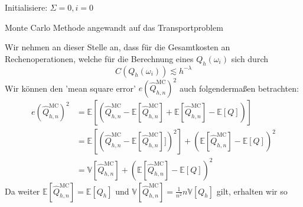 \begin{algorithm}[H]
	\DontPrintSemicolon
	\SetAlgoLined
	\BlankLine
	Initialisiere: $ \Sigma =0, i=0 $\;
	\BlankLine
	\caption{Monte Carlo Methode angewandt auf das Transportproblem}
\end{algorithm}
\bigskip %
 Wir nehmen an dieser Stelle an, dass für die Gesamtkosten an Rechenoperationen, welche für die Berechnung eines $ Q_h(\omega_i) $ sich durch
 \[
 	C(Q_h(\omega_i))  \lesssim h^{- \lambda}
 \]
 Wir können den 'mean square error' $ e(\widehat{Q}_{h,n}^{\text{MC}})^2 $ auch folgendermaßen betrachten:
 \begin{align}
 	e(\widehat{Q}_{h,n}^{\text{MC}})^2 &= \mathbb{E} \left[ \left( \widehat{Q}_{h,n}^{\text{MC}} -  \mathbb{E}[\widehat{Q}_{h,n}^{\text{MC}}] + \mathbb{E}[\widehat{Q}_{h,n}^{\text{MC}}] - \mathbb{E}[Q] \right) \right] \nonumber \\
 	&= \mathbb{E} \left[ ( \widehat{Q}_{h,n}^{\text{MC}} -    \mathbb{E}[\widehat{Q}_{h,n}^{\text{MC}}]])^2 \right] + \left( \mathbb{E}[\widehat{Q}_{h,n}^{\text{MC}}] - \mathbb{E}[Q] \right)^2 \nonumber \\
 	&= \mathbb{V}[\widehat{Q}_{h,n}^{\text{MC}}] + \left( \mathbb{E}[\widehat{Q}_{h,n}^{\text{MC}}] - \mathbb{E}[Q] \right)^2
 \end{align}
 Da weiter $ \mathbb{E}[\widehat{Q}_{h,n}^{\text{MC}}] = \mathbb{E}[Q_h] $ und $ \mathbb{V}[\widehat{Q}_{h,n}^{\text{MC}}] = \frac{1}{n^2} n \mathbb{V}[Q_h] $ gilt, erhalten wir so 
 
 
 
 
\bigskip %
 
 
 
%
%	
%
%
